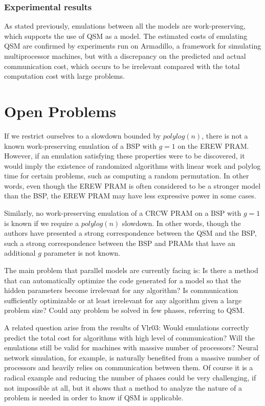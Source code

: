 \documentclass[12pt,a4paper]{article}
\begin{document}
\subsubsection{Experimental results}
As stated previously, emulations between all the models are work-preserving, which supports the use of QSM as a model. The estimated costs 
of emulating QSM are confirmed by experiments run on Armadillo, a framework for simulating multiprocessor machines, but with a discrepancy on 
the predicted and actual communication cost, which occurs to be irrelevant compared with the total computation cost with large problems.

\newpage
\section{Open Problems}

If we restrict ourselves to a slowdown bounded by $polylog(n)$, there is not a known work-preserving emulation of a BSP with $g=1$ on the EREW
PRAM. However, if an emulation satisfying these properties were to be discovered, it would imply the existence of randomized algorithms with
linear work and polylog time for certain problems, such as computing a random permutation. In other words, even though the EREW PRAM is often
considered to be a stronger model than the BSP, the EREW PRAM may have less expressive power in some cases. \cite{Gib99}

Similarly, no work-preserving emulation of a CRCW PRAM on a BSP with $g=1$ is known if we require a $polylog(n)$ slowdown. In other words,
though the authors have presented a strong correspondence between the QSM and the BSP, such a strong correspondence between the BSP and PRAMs
that have an additional $g$ parameter is not known.

The main problem that parallel models are currently facing is: Is there a method that can automatically optimize the code generated for a 
model so that the hidden parameters become irrelevant for any algorithm? Is communication sufficiently optimizable or at least irrelevant for 
any algorithm given a large problem size? Could any problem be solved in few phases, referring to QSM.

A related question arise from the results of {Vlr03}: Would emulations correctly predict the total cost for algorithms with high level of 
communication? Will the emulations still be valid for machines with massive number of processors? Neural network simulation, for example, is naturally 
benefited from a massive number of processors and heavily relies on communication between them. Of course it is a radical example and reducing the 
number of phases could be very challenging, if not impossible at all, but it shows that a method to analyze the nature of a problem is needed in order 
to know if QSM is applicable.
\end{document}
